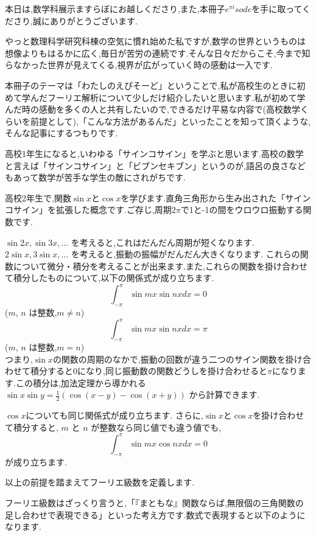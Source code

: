 本日は,数学科展示ますらぼにお越しくださり,また,本冊子$e^{\pi i}sode$を手に取ってくださり,誠にありがとうございます.

やっと数理科学研究科棟の空気に慣れ始めた私ですが,数学の世界というものは想像よりもはるかに広く,毎日が苦労の連続です.そんな日々だからこそ,今まで知らなかった世界が見えてくる,視界が広がっていく時の感動は一入です.

本冊子のテーマは「わたしのえぴそーど」ということで,私が高校生のときに初めて学んだフーリエ解析について少しだけ紹介したいと思います.私が初めて学んだ時の感動を多くの人と共有したいので,できるだけ平易な内容で(高校数学くらいを前提として),「こんな方法があるんだ」といったことを知って頂くような,そんな記事にするつもりです.

高校1年生になると,いわゆる「サインコサイン」を学ぶと思います.高校の数学と言えば「サインコサイン」と「ビブンセキブン」というのが,語呂の良さなどもあって数学が苦手な学生の敵にされがちです.

高校2年生で,関数$\sin x$と$\cos x$を学びます.直角三角形から生み出された「サインコサイン」を拡張した概念です.ご存じ,周期$2 \pi$で1と-1の間をウロウロ振動する関数です.

$\sin 2x,\sin 3x,\dotsc$ を考えると,これはだんだん周期が短くなります. $2\sin x,3\sin x,\dotsc$ を考えると,振動の振幅がだんだん大きくなります.
これらの関数について微分・積分を考えることが出来ます.また,これらの関数を掛け合わせて積分したものについて,以下の関係式が成り立ちます.
\[
\int_{-\pi}^\pi \sin mx \sin nx dx = 0
\]
($m$, $n$ は整数,$m \neq n$)
\[
  \int_{-\pi}^\pi \sin mx \sin nx dx = \pi
\]
($m$, $n$ は整数,$m = n$)\\


つまり,$\sin x$の関数の周期のなかで,振動の回数が違う二つのサイン関数を掛け合わせて積分すると0になり,同じ振動数の関数どうしを掛け合わせると$\pi$になります.この積分は,加法定理から導かれる
$\sin x \sin y = \frac{1}{2} (\cos(x-y)-\cos(x+y))$
から計算できます.

$\cos x$についても同じ関係式が成り立ちます.
さらに,$\sin x$と$\cos x$を掛け合わせて積分すると, $m$ と $n$ が整数なら同じ値でも違う値でも,
\[
  \int_{-\pi}^\pi \sin mx \cos nx dx = 0
\]
が成り立ちます.

以上の前提を踏まえてフーリエ級数を定義します.

フーリエ級数はざっくり言うと,「『まともな』関数ならば,無限個の三角関数の足し合わせで表現できる」といった考え方です.数式で表現すると以下のようになります.

